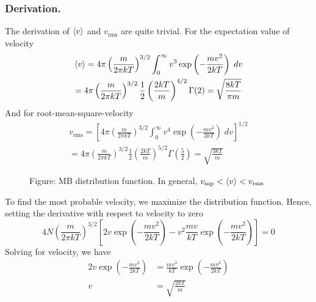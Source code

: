 \documentclass[../../../Main.tex]{subfiles}
\begin{document}
\subsubsection{Derivation.} The derivation of $\braket{v}$ and $v_\text{rms}$ are quite trivial. For the expectation value of velocity
\begin{multline*}
    \braket{v}=4\pi \left(\frac{m}{2\pi k T}\right)^{3/2} \int_{0}^{\infty}v^3\exp\left(-\frac{m v^2}{2k T}\right)\;dv\\
    =4\pi \left(\frac{m}{2\pi k T}\right)^{3/2} \frac{1}{2}\left(\frac{2kT}{m}\right)^{4/2}\Gamma(2)=\sqrt{\frac{8kT}{\pi m}}
\end{multline*} 
And for root-mean-square-velocity
\begin{multline*}
    v_\text{rms}=\left[4\pi \left(\frac{m}{2\pi k T}\right)^{3/2} \int_{0}^{\infty}v^4\exp\left(-\frac{m v^2}{2k T}\right)\;dv\right]^{1/2}\\
    =4\pi \left(\frac{m}{2\pi k T}\right)^{3/2} \frac{1}{2}\left(\frac{2kT}{m}\right)^{5/2}\Gamma\left(\frac{5}{2}\right)=\sqrt{\frac{3kT}{m}}
\end{multline*} 
\begin{figure*}
    \centering
    \caption*{Figure: MB distribution function. In general, $v_\text{mp}<\braket{v}<v_\text{rms}$}
\end{figure*}

To find the most probable velocity, we maximize the distribution function. Hence, setting the derivative with respect to velocity to zero
\begin{equation*}
    4N\left(\frac{m}{2\pi kT}\right)^{3/2}\left[2v\exp\left(-\frac{m v^2}{2k T}\right)-v^2\frac{mv}{kT}\exp\left(-\frac{m v^2}{2k T}\right)\right]=0
\end{equation*}
Solving for velocity, we have 
\begin{align*}
    2v\exp\left(-\frac{m v^2}{2k T}\right)&=\frac{mv^3}{kT}\exp\left(-\frac{m v^2}{2k T}\right)\\
    v&=\sqrt{\frac{2kT}{m}}
\end{align*}
\end{document}
